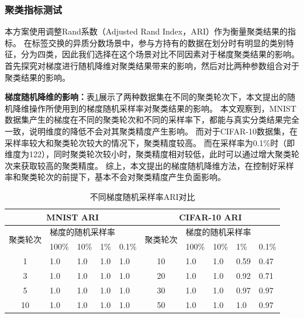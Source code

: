 \subsubsection{聚类指标测试}
本方案使用调整Rand系数（Adjusted Rand Index，ARI）\cite{hubert1985comparing}作为衡量聚类结果的指标。
在标签交换的异质分数场景中，参与方持有的数据在划分时有明显的类别特征，分为四类，因此我们选择在这个场景对比不同因素对于梯度聚类结果的影响。
首先探究对梯度进行随机降维对聚类结果带来的影响，然后对比两种参数组合对于聚类结果的影响。

\textbf{梯度随机降维的影响：}表\ref{ari-sf-cmp}展示了两种数据集在不同的聚类轮次下，本文提出的随机降维操作所使用到的梯度随机采样率对聚类结果的影响。
本文观察到，MNIST数据集产生的梯度在不同的聚类轮次和不同的采样率下，都能与真实分类结果完全一致，说明维度的降低不会对其聚类精度产生影响。
而对于CIFAR-10数据集，在采样率较大和聚类轮次较大的情况下，聚类精度较高。
而在采样率为0.1\%时（即维度为122），同时聚类轮次较小时，聚类精度相对较低，此时可以通过增大聚类轮次来获取较高的聚类精度。
综上，本文提出的梯度随机降维方法，在控制好采样率和聚类轮次的前提下，基本不会对聚类精度产生负面影响。

\begin{table}[]
	\centering
	\caption{不同梯度随机采样率ARI对比}
	\label{ari-sf-cmp}
	\begin{tabular}{lllll|lllll}
		\toprule
		\multicolumn{5}{c|}{MNIST ARI}                                             & \multicolumn{5}{c}{CIFAR-10 ARI}                                          \\ \midrule
		\multicolumn{1}{c|}{\multirow{2}{*}{聚类轮次}} & \multicolumn{4}{l|}{梯度的随机采样率} & \multicolumn{1}{l|}{\multirow{2}{*}{聚类轮次}} & \multicolumn{4}{l}{梯度的随机采样率} \\ \cline{2-5} \cline{7-10} 
		\multicolumn{1}{c|}{}                      & 100\%  & 10\%  & 1\%  & 0.1\% & \multicolumn{1}{l|}{}                      & 100\%  & 10\% & 1\%  & 0.1\% \\ \hline
		\multicolumn{1}{c|}{1}                     & 1.0    & 1.0   & 1.0  & 1.0   & \multicolumn{1}{c|}{10}                    & 1.0    & 1.0  & 0.59 & 0.47  \\
		\multicolumn{1}{c|}{3}                     & 1.0    & 1.0   & 1.0  & 1.0   & \multicolumn{1}{c|}{20}                    & 1.0    & 1.0  & 0.92 & 0.71  \\
		\multicolumn{1}{c|}{5}                     & 1.0    & 1.0   & 1.0  & 1.0   & \multicolumn{1}{c|}{30}                    & 1.0    & 1.0  & 0.97 & 0.97  \\
		\multicolumn{1}{c|}{10}                    & 1.0    & 1.0   & 1.0  & 1.0   & \multicolumn{1}{c|}{50}                    & 1.0    & 1.0  & 1.0  & 0.97 \\ \bottomrule
	\end{tabular}
\end{table}

